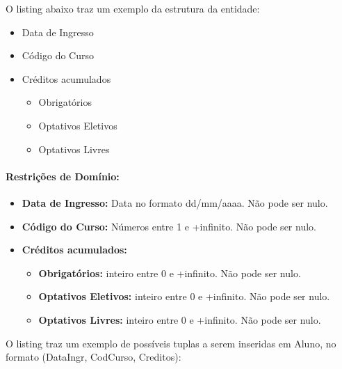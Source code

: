 \documentclass{report}
\begin{document}
	O listing abaixo traz um exemplo da estrutura da entidade:
\begin{itemize}
  \item Data de Ingresso
  \item Código do Curso
  \item Créditos acumulados
  \begin{itemize}
  	\item Obrigatórios
  	\item Optativos Eletivos
  	\item Optativos Livres
  \end{itemize}
\end{itemize}
\paragraph{Restrições de Domínio:}
\begin{itemize}
  \item \textbf{Data de Ingresso:} Data no formato dd/mm/aaaa. Não pode ser nulo.
  \item \textbf{Código do Curso:} Números entre 1 e +infinito. Não pode ser nulo.
  \item \textbf{Créditos acumulados:}
  \begin{itemize}
  	\item \textbf{Obrigatórios:} inteiro entre 0 e +infinito. Não pode ser nulo.
  	\item \textbf{Optativos Eletivos:} inteiro entre 0 e +infinito. Não pode ser nulo.
  	\item \textbf{Optativos Livres:} inteiro entre 0 e +infinito. Não pode ser nulo.
  \end{itemize}
\end{itemize}

O listing traz um exemplo de possíveis tuplas a serem inseridas em Aluno, no formato (DataIngr, CodCurso, Creditos):
\end{document}
